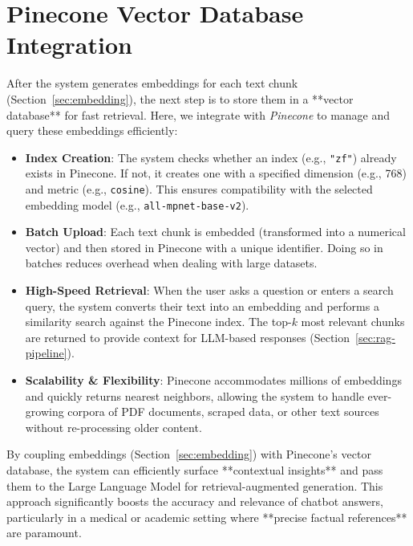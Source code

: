 \section{Pinecone Vector Database Integration}
\label{sec:pinecone}

After the system generates embeddings for each text chunk (Section~\ref{sec:embedding}), the next step is to store them in a **vector database** for fast retrieval. Here, we integrate with \emph{Pinecone} to manage and query these embeddings efficiently:

\begin{itemize}
    \item \textbf{Index Creation}: The system checks whether an index (e.g., \texttt{"zf"}) already exists in Pinecone. If not, it creates one with a specified dimension (e.g., 768) and metric (e.g., \texttt{cosine}). This ensures compatibility with the selected embedding model (e.g., \texttt{all-mpnet-base-v2}).
    \item \textbf{Batch Upload}: Each text chunk is embedded (transformed into a numerical vector) and then stored in Pinecone with a unique identifier. Doing so in batches reduces overhead when dealing with large datasets.
    \item \textbf{High-Speed Retrieval}: When the user asks a question or enters a search query, the system converts their text into an embedding and performs a similarity search against the Pinecone index. The top-$k$ most relevant chunks are returned to provide context for LLM-based responses (Section~\ref{sec:rag-pipeline}).
    \item \textbf{Scalability \& Flexibility}: Pinecone accommodates millions of embeddings and quickly returns nearest neighbors, allowing the system to handle ever-growing corpora of PDF documents, scraped data, or other text sources without re-processing older content.
\end{itemize}

By coupling embeddings (Section~\ref{sec:embedding}) with Pinecone’s vector database, the system can efficiently surface **contextual insights** and pass them to the Large Language Model for retrieval-augmented generation. This approach significantly boosts the accuracy and relevance of chatbot answers, particularly in a medical or academic setting where **precise factual references** are paramount.


